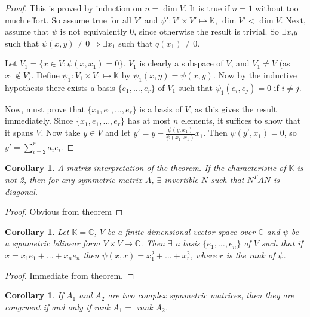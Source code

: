\documentclass{notes}
\theoremstyle{plain}
\newtheorem{corollary}[theorem]{Corollary}
\begin{document}
\begin{proof}
  This is proved by induction on $n = \dim V$.  It is true if $n=1$
  without too much effort.  So assume true for all $V'$ and $\psi' :
  V' \times V' \mapsto \mathbb{K}$, $\dim V' < \dim V$.  Next, assume
  that $\psi$ is not equivalently $0$, since otherwise the result is
  trivial.  So $\exists x$,$y$ such that $\psi(x,y)\ne 0 \Rightarrow
  \exists x_1$ such that $q(x_1) \ne 0$.
  
  Let $V_1 = \{ x \in V : \psi(x,x_1)=0\}$.  $V_1$ is clearly a
  subspace of $V$, and $V_1 \ne V$ (as $x_1 \notin V$).  Define
  $\psi_1 : V_1 \times V_1 \mapsto \mathbb{K}$ by $\psi_1(x,y) =
  \psi(x,y)$.  Now by the inductive hypothesis there exists a basis
  $\{e_1, \dots , e_r\}$ of $V_1$ such that $\psi_1(e_i,e_j)=0$ if $i
  \ne j$.
  
  Now, must prove that $\{x_1,e_1,\dots,e_r\}$ is a basis of $V$, as
  this gives the result immediately.  Since $\{x_1,e_1,\dots,e_r\}$
  has at most $n$ elements, it suffices to show that it spans $V$.
  Now take $y \in V$ and let $y' = y -
  \frac{\psi(y,x_1)}{\psi(x_1,x_1)}x_1$.  Then $\psi(y',x_1)=0$, so
  $y' = \sum_{i=2}^{r} a_i e_i$.
\end{proof}

\begin{corollary}{A matrix interpretation of the theorem.}
  If the characteristic of $\mathbb{K}$ is not 2, then for any
  symmetric matrix $A$, $\exists$ invertible $N$ such that $N^TAN$ is
  diagonal.
\end{corollary}

\begin{proof}
  Obvious from theorem
\end{proof}

\begin{corollary}
  Let $\mathbb{K}=\mathbb{C}$, $V$ be a finite dimensional vector
  space over $\mathbb{C}$ and $\psi$ be a symmetric bilinear form $V
  \times V \mapsto \mathbb{C}$.  Then $\exists$ a basis
  $\{e_1,\dots,e_n\}$ of $V$ such that if $x = x_1e_1 + \dots +
  x_ne_n$ then $\psi(x,x) = x_1^2 + \dots +x_r^2$, where $r$ is the
  rank of $\psi$.
\end{corollary}

\begin{proof}
  Immediate from theorem.
\end{proof}

\begin{corollary}
  If $A_1$ and $A_2$ are two complex symmetric matrices, then they are
  congruent if and only if rank $A_1 =$ rank $A_2$.
\end{corollary}
\end{document}
